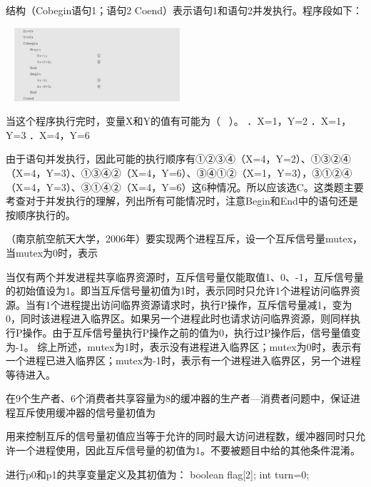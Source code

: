\question 结构（Cobegin语句1；语句2 Coend）表示语句1和语句2并发执行。程序段如下：

~
\includegraphics[width=2.42708in,height=1.07292in]{computerassets/4DDE49E225C2295AEB3F23EAC5BBDEF5.png}

当这个程序执行完时，变量X和Y的值有可能为（ ~）。 ．X=1，Y=2 ．X=1，Y=3
．X=4，Y=6
\par{}
\begin{solution}由于语句并发执行，因此可能的执行顺序有①②③④（X=4，Y=2）、①③②④（X=4，Y=3）、①③④②（X=4，Y=6）、③④①②（X=1，Y=3），③①②④（X=4，Y=3）、③①④②（X=4，Y=6）这6种情况。所以应该选C。这类题主要考查对于并发执行的理解，列出所有可能情况时，注意Begin和End中的语句还是按顺序执行的。
\end{solution}
\question （南京航空航天大学，2006年）要实现两个进程互斥，设一个互斥信号量mutex，当mutex为0时，表示
\par{}
\begin{solution}当仅有两个并发进程共享临界资源时，互斥信号量仅能取值1、0、-1，互斥信号量的初始值设为1。即当互斥信号量初值为1时，表示同时只允许1个进程访问临界资源。当有1个进程提出访问临界资源请求时，执行P操作，互斥信号量减1，变为0，同时该进程进入临界区。如果另一个进程此时也请求访问临界资源，则同样执行P操作。由于互斥信号量执行P操作之前的值为0，执行过P操作后，信号量值变为-1。
综上所述，mutex为1时，表示没有进程进入临界区；mutex为0时，表示有一个进程已进入临界区；mutex为-1时，表示有一个进程进入临界区，另一个进程等待进入。
\end{solution}
\question 在9个生产者、6个消费者共享容量为8的缓冲器的生产者---消费者问题中，保证进程互斥使用缓冲器的信号量初值为
\par{}
\begin{solution}用来控制互斥的信号量初值应当等于允许的同时最大访问进程数，缓冲器同时只允许一个进程使用，因此互斥信号量的初值为1。不要被题目中给的其他条件混淆。
\end{solution}
\question 进行p0和p1的共享变量定义及其初值为： boolean flag{[}2{]}; int turn=0;
